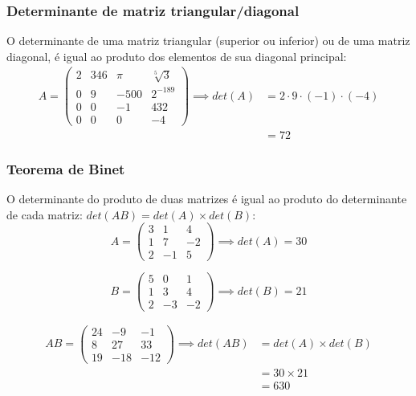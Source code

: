 \documentclass[pdftex, brazil]{beamer}
\begin{document}
\begin{frame}[t]
  \frametitle{Determinante de matriz triangular/diagonal}
  O determinante de uma matriz triangular (superior ou inferior) ou de uma
  matriz diagonal, é igual ao produto dos elementos de sua diagonal principal:
  \begin{equation*}\begin{split}A = \begin{pmatrix}
    2 & 346 & \pi & \sqrt[5]{3}\\
    0 & 9 & -500 & 2^{-189}\\
    0 & 0 & -1 & 432\\
    0 & 0 & 0 & -4\end{pmatrix} \implies det(A) &= 2 \cdot 9 \cdot (-1) \cdot (-4)\\
                                               &=72\end{split}\end{equation*}
\end{frame}

\begin{frame}[t]
  \frametitle{Teorema de Binet}
  O determinante do produto de duas matrizes é igual ao produto do determinante
  de cada matriz: $det(AB) = det(A) \times det(B)$:
  $$A = \begin{pmatrix}
    3 & 1 & 4\\
    1 & 7 & -2\\
    2 & -1 & 5\end{pmatrix} \implies det(A) = 30$$

  $$B = \begin{pmatrix}
    5 & 0 & 1\\
    1 & 3 & 4\\
    2 & -3 & -2\end{pmatrix} \implies det(B) = 21$$

  \begin{equation*}\begin{split}AB = \begin{pmatrix}
    24 & -9 & -1\\
    8 & 27 & 33\\
    19 & -18 & -12\end{pmatrix} \implies det(AB) &= det(A) \times det(B)\\
                                                 &= 30 \times 21\\
                                                 &= 630\end{split}\end{equation*}
\end{frame}
\end{document}
